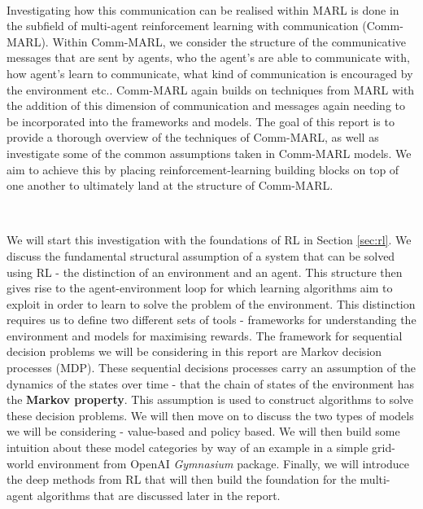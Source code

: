 \documentclass{article}
\begin{document}
\

Investigating how this communication can be realised within MARL is done in the subfield of multi-agent reinforcement learning with communication (Comm-MARL). Within Comm-MARL, we consider the structure of the communicative messages that are sent by agents, who the agent's are able to communicate with, how agent's learn to communicate, what kind of communication is encouraged by the environment etc.. Comm-MARL again builds on techniques from MARL with the addition of this dimension of communication and messages again needing to be incorporated into the frameworks and models. The goal of this report is to provide a thorough overview of the techniques of Comm-MARL, as well as investigate some of the common assumptions taken in Comm-MARL models. We aim to achieve this by placing reinforcement-learning building blocks on top of one another to ultimately land at the structure of Comm-MARL.

\

We will start this investigation with the foundations of RL in Section \ref{sec:rl}. We discuss the fundamental structural assumption of a system that can be solved using RL - the distinction of an environment and an agent. This structure then gives rise to the agent-environment loop for which learning algorithms aim to exploit in order to learn to solve the problem of the environment.  This distinction requires us to define two different sets of tools - frameworks for understanding the environment and models for maximising rewards. The framework for sequential decision problems we will be considering in this report are Markov decision processes (MDP). These sequential decisions processes carry an assumption of the dynamics of the states over time - that the chain of states of the environment has the \textbf{Markov property}. This assumption is used to construct algorithms to solve these decision problems. We will then move on to discuss the two types of models we will be considering - value-based and policy based. We will then build some intuition about these model categories by way of an example in a simple grid-world environment from OpenAI \textit{Gymnasium} \citep{kwiatkowski2024gymnasium} package. Finally, we will introduce the deep methods from RL that will then build the foundation for the multi-agent algorithms that are discussed later in the report.

\ 
 
\end{document}
